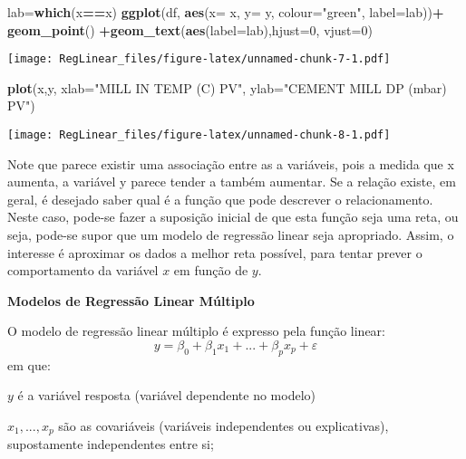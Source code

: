 \documentclass[]{article}
\newenvironment{Shaded}{\begin{snugshade}}{\end{snugshade}}
\newcommand{\DataTypeTok}[1]{\textcolor[rgb]{0.13,0.29,0.53}{#1}}
\newcommand{\DecValTok}[1]{\textcolor[rgb]{0.00,0.00,0.81}{#1}}
\newcommand{\KeywordTok}[1]{\textcolor[rgb]{0.13,0.29,0.53}{\textbf{#1}}}
\newcommand{\NormalTok}[1]{#1}
\newcommand{\OperatorTok}[1]{\textcolor[rgb]{0.81,0.36,0.00}{\textbf{#1}}}
\newcommand{\StringTok}[1]{\textcolor[rgb]{0.31,0.60,0.02}{#1}}
\begin{document}
\begin{Shaded}
\begin{Highlighting}[]
\NormalTok{lab=}\KeywordTok{which}\NormalTok{(x}\OperatorTok{==}\NormalTok{x)}
\KeywordTok{ggplot}\NormalTok{(df, }\KeywordTok{aes}\NormalTok{(}\DataTypeTok{x=}\NormalTok{ x, }\DataTypeTok{y=}\NormalTok{ y, }\DataTypeTok{colour=}\StringTok{"green"}\NormalTok{, }\DataTypeTok{label=}\NormalTok{lab))}\OperatorTok{+}
\StringTok{  }\KeywordTok{geom_point}\NormalTok{() }\OperatorTok{+}\KeywordTok{geom_text}\NormalTok{(}\KeywordTok{aes}\NormalTok{(}\DataTypeTok{label=}\NormalTok{lab),}\DataTypeTok{hjust=}\DecValTok{0}\NormalTok{, }\DataTypeTok{vjust=}\DecValTok{0}\NormalTok{)}
\end{Highlighting}
\end{Shaded}

\texttt{[image: RegLinear\_files/figure-latex/unnamed-chunk-7-1.pdf]}

\begin{Shaded}
\begin{Highlighting}[]
\KeywordTok{plot}\NormalTok{(x,y, }\DataTypeTok{xlab=}\StringTok{"MILL IN TEMP (C) PV"}\NormalTok{, }\DataTypeTok{ylab=}\StringTok{"CEMENT MILL DP (mbar) PV"}\NormalTok{)}
\end{Highlighting}
\end{Shaded}

\texttt{[image: RegLinear\_files/figure-latex/unnamed-chunk-8-1.pdf]}

Note que parece existir uma associação entre as a variáveis, pois a
medida que x aumenta, a variável y parece tender a também aumentar. Se a
relação existe, em geral, é desejado saber qual é a função que pode
descrever o relacionamento. Neste caso, pode-se fazer a suposição
inicial de que esta função seja uma reta, ou seja, pode-se supor que um
modelo de regressão linear seja apropriado. Assim, o interesse é
aproximar os dados a melhor reta possível, para tentar prever o
comportamento da variável \(x\) em função de \(y\).

\textbf{Modelos de Regressão Linear Múltiplo}

O modelo de regressão linear múltiplo é expresso pela função linear:
\[y = \beta_0 + \beta_1 x_1 + ... + \beta_p x_p + \varepsilon\] em que:

\(y\) é a variável resposta (variável dependente no modelo)

\(x_1,...,x_p\) são as covariáveis (variáveis independentes ou
explicativas), supostamente independentes entre si;
\end{document}
